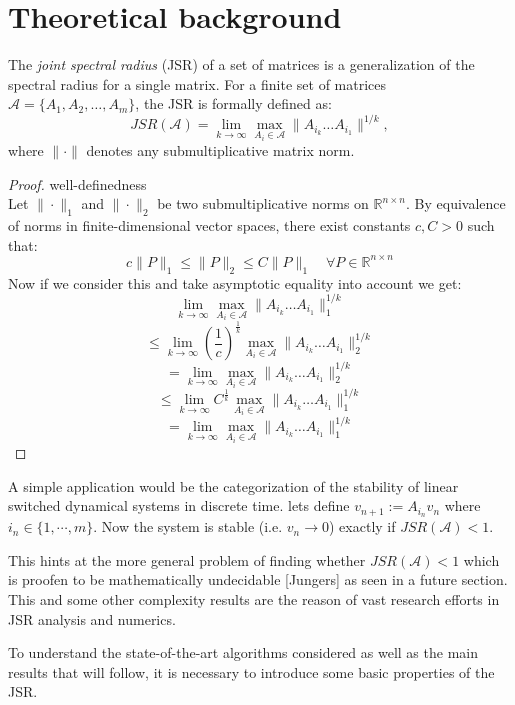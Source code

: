 \section{Theoretical background}

The \emph{joint spectral radius} (JSR) of a set of matrices is a generalization of the spectral radius for a single matrix. For a finite set of matrices $\mathcal{A} = \{A_1, A_2, \dots, A_m\}$, the JSR is formally defined as:
\begin{equation}
    JSR(\mathcal{A}) = \lim_{k \to \infty} \max_{A_i \in \mathcal{A}} \|A_{i_k} \dots A_{i_1}\|^{1/k},
\end{equation}
where $\|\cdot\|$ denotes any submultiplicative matrix norm.

\begin{proof}{well-definedness\\}
Let $\| \cdot \|_1$   and $ \| \cdot \|_2 $ be two submultiplicative norms on $ \mathbb{R}^{n \times n} $. By equivalence of norms in finite-dimensional vector spaces, there exist constants $ c, C > 0 $ such that:
$$
c \|P\|_1 \leq \|P\|_2 \leq C \|P\|_1 \quad \forall P \in \mathbb{R}^{n \times n}
$$
Now if we consider this and take asymptotic equality into account we get: 
$$
\lim_{k \to \infty} \max_{A_i \in \mathcal{A}} \|A_{i_k} \dots A_{i_1}\|_{1}^{1/k} 
$$
$$
\le \lim_{k \to \infty} {(\frac{1}{c})}^{\frac{1}{k}} \max_{A_i \in \mathcal{A}} \|A_{i_k} \dots A_{i_1}\|_{2}^{1/k} 
$$
$$
= \lim_{k \to \infty} \max_{A_i \in \mathcal{A}} \|A_{i_k} \dots A_{i_1}\|_{2}^{1/k} 
$$
$$
\le \lim_{k \to \infty} {C}^{\frac{1}{k}} \max_{A_i \in \mathcal{A}} \|A_{i_k} \dots A_{i_1}\|_{1}^{1/k}
$$
$$
= \lim_{k \to \infty} \max_{A_i \in \mathcal{A}} \|A_{i_k} \dots A_{i_1}\|_{1}^{1/k}
$$
\end{proof}

A simple application would be the categorization of the stability of linear switched dynamical systems in discrete time. 
lets define $v_{n+1} := A_{i_n}v_{n}$ where $i_n \in \{1, \cdots , m\}$. Now the system is stable (i.e. $v_n \rightarrow 0$) exactly if $JSR(\mathcal{A}) < 1$.

This hints at the more general problem of finding whether $JSR(\mathcal{A}) < 1$ which is proofen to be mathematically undecidable [Jungers] as seen in a future section. This and some other complexity results are the reason of vast research efforts in JSR analysis and numerics. 

To understand the state-of-the-art algorithms considered as well as the main results that will follow, it is necessary to introduce some basic properties of the JSR.

